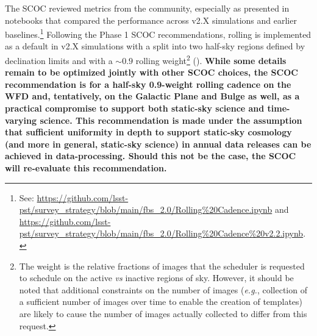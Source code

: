  The SCOC reviewed metrics from the community, especially as presented in notebooks that compared the performance across v2.X simulations and earlier baselines.\footnote{See: \url{https://github.com/lsst-pst/survey_strategy/blob/main/fbs_2.0/Rolling\%20Cadence.ipynb} and \url{https://github.com/lsst-pst/survey_strategy/blob/main/fbs_2.0/Rolling\%20Cadence\%20v2.2.ipynb}.} Following the Phase 1 SCOC recommendations, rolling is implemented as a default in v2.X simulations with a split into two half-sky regions defined by declination limits and with a $\sim0.9$ rolling weight\footnote{The weight is the relative fractions of images that the scheduler is requested to schedule on the active \emph{vs} inactive regions of sky. However, it should be noted that additional constraints on the number of images (\emph{e.g.}, collection of a sufficient number of images over time to enable the creation of templates) are likely to cause the number of images actually collected to differ from this request.} (). {\bf While some details remain to be optimized jointly with other SCOC choices, the SCOC recommendation is for a half-sky 0.9-weight rolling cadence on the WFD and, tentatively, on the Galactic Plane and Bulge as well, as a practical compromise to support both static-sky science and time-varying science.    
This recommendation is made under the assumption that sufficient uniformity in depth to support static-sky cosmology (and more in general, static-sky science) in annual data releases can be achieved in data-processing.  Should this not be the case, the SCOC will re-evaluate this recommendation.}


